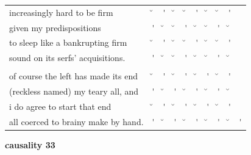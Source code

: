 \documentclass[12pt, landscape]{article}
\begin{document}
\begin{center}
\begin{tabularx}{\textwidth}{
>{\lefting\arraybackslash}X
c
c
c
c
c
c
c
c
c
}

increasingly hard to be firm & \u{} & \'{} & \u{} & \u{} & \'{} & \u{} & \u{} & \'{} & \\
given my predispositions & \'{} & \u{} & \u{} & \'{} & \u{} & \u{} & \'{} & \u{} & \\
to sleep like a bankrupting firm & \u{} & \'{} & \u{} & \u{} & \'{} & \u{} & \u{} & \'{} & \\
sound on its serfs' acquisitions. & \'{} & \u{} & \u{} & \'{} & \u{} & \u{} & \'{} & \u{} & \\
 & & & & & & & & \\
of course the left has made its end & \u{} & \'{} & \u{} & \'{} & \u{} & \'{} & \u{} & \'{} & \\
(reckless named) my teary all, and & \'{} & \u{} & \'{} & \u{} & \'{} & \u{} & \'{}  & \u{} & \\
i do agree to start that end & \u{} & \'{} & \u{} & \'{} & \u{} & \'{} & \u{} & \'{} & \\
all coerced to brainy make by hand. & \'{} & \u{} & \'{} & \u{} & \'{} & \u{} & \'{}  & \u{} & \'{} \\

\end{tabularx}
\end{center}

\vspace*{\fill}

\newpage

\vspace*{\fill}

\noindent \textbf{causality 33}
\noindent \hfill \par
\end{document}
